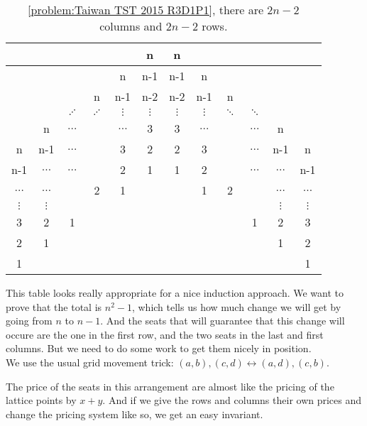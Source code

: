\begin{table}[H]
    \centering
    \begin{tabular}{|c|c|c|c|c|c|c|c|c|c|c|c|}
        \hline
        & & & & & n & n & & & & & \\\hline
        & & & & n & n-1 & n-1 & n & & & & \\\hline
        & & & n& n-1 & n-2 & n-2 & n-1 & n & & & \\\hline
        & & $\iddots$ & $\iddots$ & $\vdots$ & $\vdots$ & $\vdots$ & $\vdots$ & $\ddots$
        & $\ddots$ & & \\\hline
        & n& $\dots$ & & $\dots$ & 3 & 3 & $\dots$ & & $\dots$ & n & \\\hline
        n& n-1& $\dots$ & & 3 & 2 & 2 & 3 & & $\dots$ & n-1 & n\\\hline
        n-1& $\dots$ & $\dots$ & & 2 & 1 & 1 & 2 & & $\dots$ & $\dots$ & n-1\\\hline
        $\dots$& $\dots$ & & 2 & 1 &  &  & 1 & 2 & & $\dots$ & $\dots$\\\hline
        $\vdots$& $\vdots$ &  &  &  &  &  & &  & & $\vdots$ & $\vdots$\\\hline
        3& 2 & 1 & & &  &  & & & 1 & 2 & 3\\\hline
        2& 1 &  & &  &  &  &  &  & & 1 & 2\\\hline
        1 & &  & &  &  &  &  &  & & &  1 \\\hline
    \end{tabular} 
    \caption{\autoref{problem:Taiwan TST 2015 R3D1P1}, there are $2n-2$
    columns and $2n-2$ rows.}
\end{table}


\begin{solution}[induction]
    This table looks really appropriate for a nice induction approach. We want
    to prove that the total is $n^2-1$, which tells us how much change we will
    get by going from $n$ to $n-1$. And the seats that will guarantee that
    this change will occure are the one in the first row, and the two seats in
    the last and first columns. But we need to do some work to get them nicely
    in position. \\

    We use the usual grid movement trick: $(a,b), (c,d) \leftrightarrow (a,d),
    (c,b)$.
\end{solution}

\begin{solution}[MellowMelon]
    The price of the seats in this arrangement are almost like the pricing of
    the lattice points by $x+y$. And if we give the rows and columns their own
    prices and change the pricing system like so, we get an easy invariant.
\end{solution}



